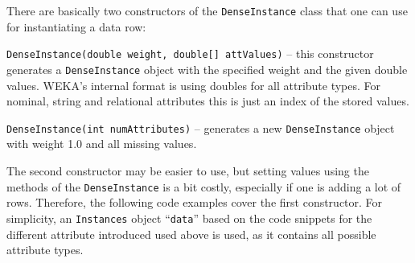 There are basically two constructors of the \texttt{DenseInstance} class that
one can use for instantiating a data row:
\begin{tight_itemize}
	\item \texttt{DenseInstance(double weight, double[] attValues)} --
this constructor generates a \texttt{DenseInstance} object with the specified
weight and the given double values. WEKA's internal format is using doubles for
all attribute types. For nominal, string and relational attributes this is just
an index of the stored values.
	\item \texttt{DenseInstance(int numAttributes)} -- generates a new
\texttt{DenseInstance} object with weight 1.0 and all missing values.
\end{tight_itemize}
The second constructor may be easier to use, but setting values using the
methods of the \texttt{DenseInstance} is a bit costly, especially
if one is adding a lot of rows. Therefore, the following code examples cover the
first constructor. For simplicity, an \texttt{Instances} object
``\texttt{data}'' based on the code snippets for the different attribute
introduced used above is used, as it contains all possible attribute types.


